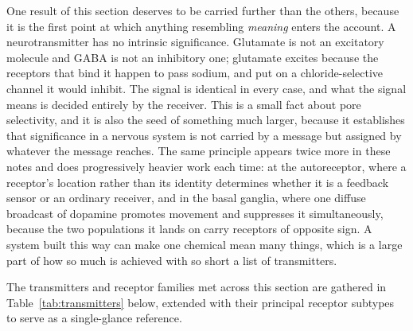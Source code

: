 \documentclass[11pt]{article}
\begin{document}
One result of this section deserves to be carried further than the others, because it is the first point at which anything resembling \textit{meaning} enters the account. A neurotransmitter has no intrinsic significance. Glutamate is not an excitatory molecule and GABA is not an inhibitory one; glutamate excites because the receptors that bind it happen to pass sodium, and put on a chloride-selective channel it would inhibit. The signal is identical in every case, and what the signal means is decided entirely by the receiver. This is a small fact about pore selectivity, and it is also the seed of something much larger, because it establishes that significance in a nervous system is not carried by a message but assigned by whatever the message reaches. The same principle appears twice more in these notes and does progressively heavier work each time: at the autoreceptor, where a receptor's location rather than its identity determines whether it is a feedback sensor or an ordinary receiver, and in the basal ganglia, where one diffuse broadcast of dopamine promotes movement and suppresses it simultaneously, because the two populations it lands on carry receptors of opposite sign. A system built this way can make one chemical mean many things, which is a large part of how so much is achieved with so short a list of transmitters.

The transmitters and receptor families met across this section are gathered in Table~\ref{tab:transmitters} below, extended with their principal receptor subtypes to serve as a single-glance reference.
\end{document}
